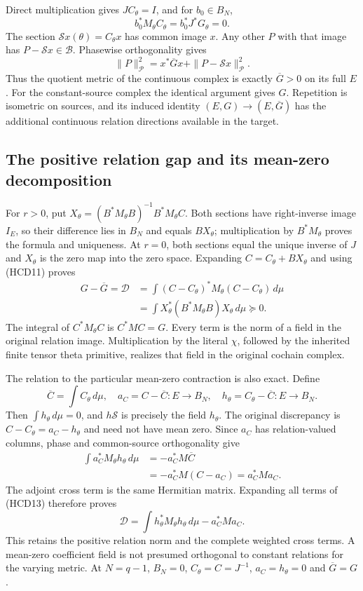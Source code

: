 \documentclass[11pt,a4paper]{article}
\theoremstyle{definition}
\begin{document}
Direct multiplication gives $JC_\theta=I$, and for $b_0\in B_N$,
\[
 b_0^*M_\theta C_\theta=b_0^*J^*G_\theta=0.
 \tag{HCD11}
\]
The section $\mathscr Sx(\theta)=C_\theta x$ has common image
$x$. Any other $P$ with that image has
$P-\mathscr Sx\in\mathscr B$. Phasewise orthogonality gives
\[
 \|P\|_{\mathscr P}^2
 =x^*\overline Gx+\|P-\mathscr Sx\|_{\mathscr P}^2.
 \tag{HCD12}
\]
Thus the quotient metric of the continuous complex is exactly
$\overline G>0$ on its full $E$. For the constant-source
complex the identical argument gives $G$. Repetition is
isometric on sources, and its induced identity
$(E,G)\to(E,\overline G)$ has the additional continuous
relation directions available in the target.

\subsection{The positive relation gap and its mean-zero decomposition}

For $r>0$, put
$X_\theta=(B^*M_\theta B)^{-1}B^*M_\theta C$.
Both sections have right-inverse image $I_E$, so their difference
lies in $B_N$ and equals $BX_\theta$; multiplication by
$B^*M_\theta$ proves the formula and uniqueness.
At $r=0$, both sections equal the unique inverse of $J$ and
$X_\theta$ is the zero map into the zero space.
Expanding $C=C_\theta+BX_\theta$ and using (HCD11) proves
\[
 \boxed{
 \begin{aligned}
 G-\overline G=\mathscr D
 &=\int(C-C_\theta)^*M_\theta(C-C_\theta)\,d\mu\\
 &=\int X_\theta^*(B^*M_\theta B)X_\theta\,d\mu\succeq0.
 \end{aligned}}
 \tag{HCD13}
\]
The integral of $C^*M_\theta C$ is $C^*MC=G$.
Every term is the norm of a field in the original relation
image. Multiplication by the literal $\chi$, followed by
the inherited finite tensor theta primitive, realizes
that field in the original cochain complex.

The relation to the particular mean-zero contraction is also exact.
Define
\[
 \overline C=\int C_\theta\,d\mu,\quad
 a_C=C-\overline C:E\to B_N,\quad
 h_\theta=C_\theta-\overline C:E\to B_N.
 \tag{HCD14}
\]
Then $\int h_\theta\,d\mu=0$, and $h\mathscr S$ is precisely
the field $h_\theta$. The original discrepancy is
$C-C_\theta=a_C-h_\theta$ and need not have mean zero.
Since $a_C$ has relation-valued columns, phase and
common-source orthogonality give
\[
 \begin{split}
 \int a_C^*M_\theta h_\theta\,d\mu
 &=-a_C^*M\overline C\\
 &=-a_C^*M(C-a_C)=a_C^*Ma_C.
 \end{split}
 \tag{HCD15}
\]
The adjoint cross term is the same Hermitian matrix.
Expanding all terms of (HCD13) therefore proves
\[
 \boxed{\mathscr D
 =\int h_\theta^*M_\theta h_\theta\,d\mu-a_C^*Ma_C.}
 \tag{HCD16}
\]
This retains the positive relation norm and the complete
weighted cross terms. A mean-zero coefficient field is
not presumed orthogonal to constant relations for the
varying metric. At $N=q-1$, $B_N=0$,
$C_\theta=C=J^{-1}$, $a_C=h_\theta=0$ and $\overline G=G$.
\end{document}
